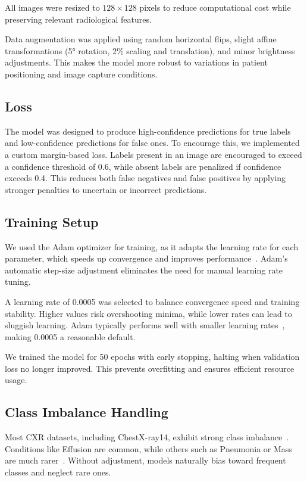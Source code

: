 \documentclass[12pt]{article}
\begin{document}
\begin{multicols}{2}
All images were resized to $128\times128$ pixels to reduce computational cost while preserving relevant radiological features.

Data augmentation was applied using random horizontal flips, slight affine transformations (5° rotation, 2\% scaling and translation), and minor brightness adjustments. This makes the model more robust to variations in patient positioning and image capture conditions.

\subsection{Loss}

The model was designed to produce high-confidence predictions for true labels and low-confidence predictions for false ones. To encourage this, we implemented a custom margin-based loss. Labels present in an image are encouraged to exceed a confidence threshold of 0.6, while absent labels are penalized if confidence exceeds 0.4. This reduces both false negatives and false positives by applying stronger penalties to uncertain or incorrect predictions.

\subsection{Training Setup}

We used the Adam optimizer for training, as it adapts the learning rate for each parameter, which speeds up convergence and improves performance~\cite{adam}. Adam’s automatic step-size adjustment eliminates the need for manual learning rate tuning.

A learning rate of 0.0005 was selected to balance convergence speed and training stability. Higher values risk overshooting minima, while lower rates can lead to sluggish learning. Adam typically performs well with smaller learning rates~\cite{adam}, making 0.0005 a reasonable default.

We trained the model for 50 epochs with early stopping, halting when validation loss no longer improved. This prevents overfitting and ensures efficient resource usage.

\subsection{Class Imbalance Handling}

Most CXR datasets, including ChestX-ray14, exhibit strong class imbalance~\cite{wang2017chestx}. Conditions like Effusion are common, while others such as Pneumonia or Mass are much rarer~\cite{mimic, adam}. Without adjustment, models naturally bias toward frequent classes and neglect rare ones.


\end{multicols}
\end{document}
